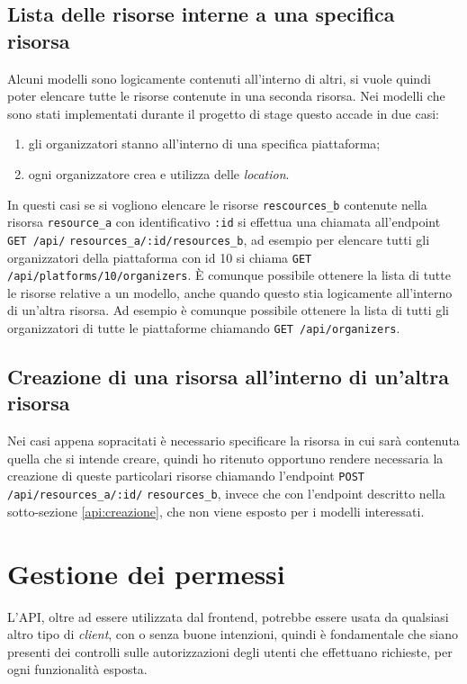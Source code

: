 \subsection{Lista delle risorse interne a una specifica risorsa} \label{api:lista-risorsa}
Alcuni modelli sono logicamente contenuti all'interno di altri, si vuole quindi poter elencare tutte le risorse contenute in una seconda risorsa. Nei modelli che sono stati implementati durante il progetto di stage questo accade in due casi:
\begin{enumerate}
	\item gli organizzatori stanno all'interno di una specifica piattaforma;
	\item ogni organizzatore crea e utilizza delle \emph{location}.
\end{enumerate} In questi casi se si vogliono elencare le risorse \verb|rescources_b| contenute nella risorsa \verb|resource_a| con identificativo \verb|:id| si effettua una chiamata all'endpoint \verb|GET /api/| \verb|resources_a/:id/resources_b|, ad esempio per elencare tutti gli organizzatori della piattaforma con id 10 si chiama \verb|GET /api/platforms/10/organizers|. È comunque possibile ottenere la lista di tutte le risorse relative a un modello, anche quando questo stia logicamente all'interno di un'altra risorsa. Ad esempio è comunque possibile ottenere la lista di tutti gli organizzatori di tutte le piattaforme chiamando \verb|GET /api/organizers|.

\subsection{Creazione di una risorsa all'interno di un'altra risorsa} \label{api:creazione-risorsa}
Nei casi appena sopracitati è necessario specificare la risorsa in cui sarà contenuta quella che si intende creare, quindi ho ritenuto opportuno rendere necessaria la creazione di queste particolari risorse chiamando l'endpoint \verb|POST /api/resources_a/:id/| \verb|resources_b|, invece che con l'endpoint descritto nella sotto-sezione \ref{api:creazione}, che non viene esposto per i modelli interessati.


\section{Gestione dei permessi}
L'API, oltre ad essere utilizzata dal frontend, potrebbe essere usata da qualsiasi altro tipo di \emph{client}, con o senza buone intenzioni, quindi è fondamentale che siano presenti dei controlli sulle autorizzazioni degli utenti che effettuano richieste, per ogni funzionalità esposta.

